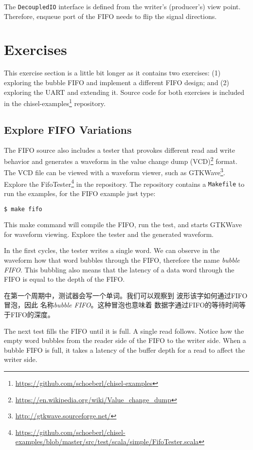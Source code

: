 \documentclass[%
    10pt,
    headinclude, footexclude,
    openright, %
    notitlepage,
    cleardoubleempty,
    headsepline,
    pointlessnumbers,
    bibtotoc, idxtotoc,
    ]{scrbook}
\newcommand{\code}[1]{{\small{\texttt{#1}}}}
\newcommand{\myref}[2]{\href{#1}{#2}}
\renewcommand{\myref}[2]{{#2}{\footnote{\url{#1}}}}
\begin{document}

\noindent The \code{DecoupledIO} interface is defined from the writer's (producer's) view point.
Therefore, enqueue port of the FIFO needs to flip the signal directions.

\section{Exercises}

This exercise section is a little bit longer as it contains two exercises:
(1) exploring the bubble FIFO and implement a different FIFO design;
and (2) exploring the UART and extending it.
Source code for both exercises is included in the
\myref{https://github.com/schoeberl/chisel-examples}{chisel-examples} repository.

\subsection{Explore FIFO Variations}

The FIFO source also includes a tester that provokes different read and write behavior and generates a waveform in the 
\myref{https://en.wikipedia.org/wiki/Value_change_dump}{value change dump (VCD)} format.
The VCD file can be viewed with a waveform viewer, such as
\myref{http://gtkwave.sourceforge.net/}{GTKWave}.
Explore the
\myref{https://github.com/schoeberl/chisel-examples/blob/master/src/test/scala/simple/FifoTester.scala}{FifoTester} in the repository.
The repository contains a \code{Makefile} to run the examples, for the FIFO example
just type:
\begin{verbatim}
$ make fifo
\end{verbatim}
This make command will compile the FIFO, run the test, and starts GTKWave for waveform
viewing. Explore the tester and the generated waveform.

In the first cycles, the tester writes a single word. We can observe in
the waveform how that word bubbles through the FIFO, therefore the
name \emph{bubble FIFO}. This bubbling also means that the
latency of a data word through the FIFO is equal to the depth of the FIFO.

在第一个周期中，测试器会写一个单词。我们可以观察到
波形该字如何通过FIFO冒泡，因此
名称\emph{bubble FIFO}。这种冒泡也意味着
数据字通过FIFO的等待时间等于FIFO的深度。

The next test fills the FIFO until it is full. A single read follows.
Notice how the empty word bubbles from the reader side of the FIFO
to the writer side. When a bubble FIFO is full, it takes
a latency of the buffer depth for a read to affect the writer side. 
\end{document}
